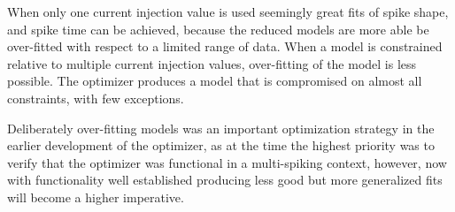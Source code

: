 When only one current injection value is used seemingly great fits of spike shape, and spike time can be achieved, because the reduced models are more able be over-fitted with respect to a limited range of data. When a model is constrained relative to multiple current injection values, over-fitting of the model is less possible. The optimizer produces a model that is compromised on almost all constraints, with few exceptions. %

Deliberately over-fitting models was an important optimization strategy in the earlier development of the optimizer, as at the time the highest priority was to verify that the optimizer was functional in a multi-spiking context, however, now with functionality well established producing less good but more generalized fits will become a higher imperative.





% 






